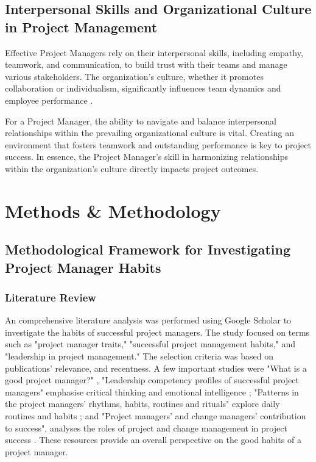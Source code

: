 \documentclass{article}
\begin{document}
\subsection{Interpersonal Skills and Organizational Culture in Project Management}

Effective Project Managers rely on their interpersonal skills, including empathy, teamwork, and communication, to build trust with their teams and manage various stakeholders. The organization's culture, whether it promotes collaboration or individualism, significantly influences team dynamics and employee performance \cite{nusari2018impact}.

For a Project Manager, the ability to navigate and balance interpersonal relationships within the prevailing organizational culture is vital. Creating an environment that fosters teamwork and outstanding performance is key to project success. In essence, the Project Manager's skill in harmonizing relationships within the organization's culture directly impacts project outcomes.


\section{Methods \& Methodology}

\subsection{Methodological Framework for Investigating Project Manager Habits}

\subsubsection{Literature Review}

An comprehensive literature analysis was performed using Google Scholar to investigate the habits of successful project managers. The study focused on terms such as "project manager traits," "successful project management habits," and "leadership in project management." The selection criteria was based on publications' relevance, and recentness. A few important studies were "What is a good project manager?" \cite{bredillet2015good}, "Leadership competency profiles of successful project managers" emphasise critical thinking and emotional intelligence \cite{muller2010leadership}; "Patterns in the project managers’ rhythms, habits, routines and rituals" explore daily routines and habits \cite{sigurdhssonpatterns}; and "Project managers’ and change managers’ contribution to success", analyses the roles of project and change management in project success \cite{pollack2016project}. These resources provide an overall perspective on the good habits of a project manager.
\end{document}
